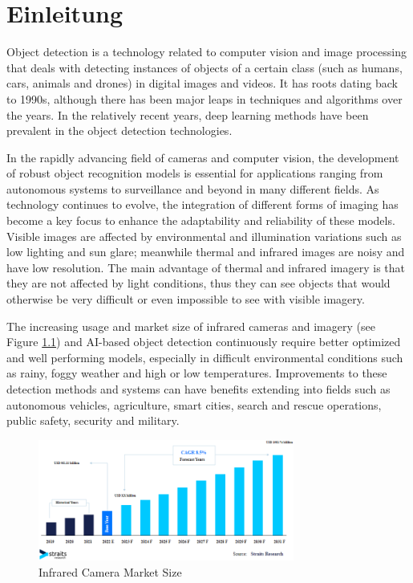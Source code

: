 \chapter{Einleitung}
\label{cha:Einleitung}

Object detection is a technology related to computer vision and image processing that deals with detecting instances of objects of a certain class (such as humans, cars, animals and drones) in digital images and videos. It has roots dating back to 1990s, although there has been major leaps in techniques and algorithms over the years. In the relatively recent years, deep learning methods have been prevalent in the object detection technologies.

In the rapidly advancing field of cameras and computer vision, the development of robust object recognition models is essential for applications ranging from autonomous systems to surveillance and beyond in many different fields. As technology continues to evolve, the integration of different forms of imaging has become a key focus to enhance the adaptability and reliability of these models. Visible images are affected by environmental and illumination variations such as low lighting and sun glare; meanwhile thermal and infrared images are noisy and have low resolution. \cite[p.1]{systematicreview23} The main advantage of thermal and infrared imagery is that they are not affected by light conditions, thus they can see objects that would otherwise be very difficult or even impossible to see with visible imagery.

The increasing usage and market size of infrared cameras and imagery (see Figure \ref{fig:marketsize}) and AI-based object detection continuously require better optimized and well performing models, especially in difficult environmental conditions such as rainy, foggy weather and high or low temperatures. Improvements to these detection methods and systems can have benefits extending into fields such as autonomous vehicles, agriculture, smart cities, search and rescue operations, public safety, security and military. 

\begin{figure}[!ht]
	\centering
		\includegraphics[width=0.75\textwidth]{images/straitsresearch_infrared_camera_marketsize.png}
	\caption{Infrared Camera Market Size \citep{infraredcameramarket}}
	\label{fig:marketsize}
\end{figure}

